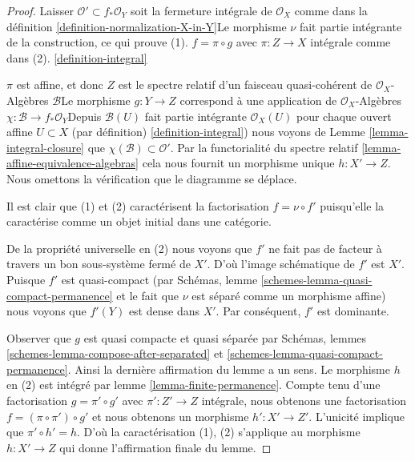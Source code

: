 \begin{proof}

Laisser $\mathcal{O}' \subset f_*\mathcal{O}_Y$ soit la fermeture intégrale de
$\mathcal{O}_X$ comme dans la définition \ref{definition-normalization-X-in-Y}Le morphisme $\nu$ fait partie intégrante de la construction, ce qui prouve (1). $f = \pi \circ g$ avec $\pi : Z \to X$
intégrale comme dans (2). \ref{definition-integral}

$\pi$ est affine, et donc $Z$ est le spectre relatif d'un faisceau quasi-cohérent de $\mathcal{O}_X$-Algèbres $\mathcal{B}$Le morphisme $g : Y \to Z$ correspond à une application de $\mathcal{O}_X$-Algèbres
$\chi : \mathcal{B} \to f_*\mathcal{O}_Y$Depuis $\mathcal{B}(U)$ fait partie intégrante $\mathcal{O}_X(U)$ pour chaque ouvert affine $U \subset X$
(par définition) \ref{definition-integral}) nous voyons de Lemme \ref{lemma-integral-closure}
que $\chi(\mathcal{B}) \subset \mathcal{O}'$. Par la functorialité du spectre relatif \ref{lemma-affine-equivalence-algebras}
cela nous fournit un morphisme unique
$h : X' \to Z$. Nous omettons la vérification que le diagramme se déplace.

\medskip\noindent
Il est clair que (1) et (2) caractérisent la factorisation $f = \nu \circ f'$ puisqu'elle la caractérise comme un objet initial dans une catégorie.

\medskip\noindent
De la propriété universelle en (2) nous voyons que $f'$ ne fait pas de facteur à travers un bon sous-système fermé de $X'$. D'où l'image schématique de $f'$ est $X'$. Puisque $f'$ est quasi-compact (par Schémas, lemme \ref{schemes-lemma-quasi-compact-permanence} et le fait que $\nu$ est séparé comme un morphisme affine) nous voyons que $f'(Y)$ est dense dans $X'$. Par conséquent, $f'$ est dominante.

\medskip\noindent

Observer que $g$ est quasi compacte et quasi séparée par Schémas, lemmes \ref{schemes-lemma-compose-after-separated} et
\ref{schemes-lemma-quasi-compact-permanence}. Ainsi la dernière affirmation du lemme a un sens. Le morphisme $h$ en (2) est intégré par lemme \ref{lemma-finite-permanence}. Compte tenu d'une factorisation $g = \pi' \circ g'$ avec $\pi' : Z' \to Z$
intégrale, nous obtenons une factorisation $f = (\pi \circ \pi') \circ g'$ et nous obtenons un morphisme $h' : X' \to Z'$. L'unicité implique que
$\pi' \circ h' = h$. D'où la caractérisation (1), (2) s'applique au morphisme $h : X' \to Z$ qui donne l'affirmation finale du lemme.

\end{proof}

